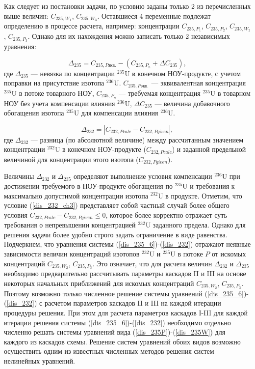 Как следует из постановки задачи, по условию заданы только 2 из перечисленных выше величин: $C_{235,{W_1}}$, $C_{235,{W_3}}$. Оставшиеся 4 переменные подлежат определению в процессе расчета, например: концентрации $C_{235,{P_1}}$, $C_{235,{P_2}}$, $C_{235,{W_2}}$, $C_{235,{P_3}}$. Однако для их нахождения можно записать только 2 независимых уравнения:  

\begin{equation}
    \label{dis_235_6}
    \Delta_{235}=C_{235,P\textit{экв.}}-(C_{235,{P_{n}}}+\Delta C_{235}),
\end{equation}
где $\Delta_{235}$ --- невязка по концентрации $^{235}$U в конечном НОУ-продукте, с учетом поправки на присутствие изотопа $^{236}$U. $C_{235,P\textit{экв.}}$ --- эквивалентная концентрация $^{235}$U в потоке товарного НОУ, $C_{235,{P_{n}}}$ --- требуемая концентрация $^{235}$U в товарном НОУ без учета компенсации влияния $^{236}$U, $\Delta C_{235}$ --- величина добавочного обогащения изотопа $^{235}$U для компенсации влияния $^{236}$U. 

\begin{equation}
\label{dis_232}
\Delta_{232}=\left|C_{232,P\textit{calc}}-C_{232,P\textit{given}}\right|,
\end{equation}
где $\Delta_{232}$ --- разница (по абсолютной величине) между рассчитанным значением концентрации $^{232}$U в конечном НОУ-продукте ($C_{232,P\textit{calc}}$) и заданной предельной величиной для концентрации этого изотопа ($C_{232,P\textit{given}}$).

Величины $\Delta_{232}$ и $\Delta_{235}$ определяют выполнение условия компенсации $^{236}$U при достижении требуемого в НОУ-продукте обогащения по $^{235}$U и требования к максимально допустимой концентрации изотопа $^{232}$U в продукте. Отметим, что условие (\ref{dis_232_ch3}) представляет собой частный случай более общего условия $C_{232,P\textit{calc}}-C_{232,P\textit{given}}\leq 0$, которое более корректно отражает суть требования о непревышении концентрацией $^{232}$U заданного предела. Однако для решения задачи более удобно строго задать ограничение в виде равенства. Подчеркнем, что уравнения системы (\ref{dis_235_6})-(\ref{dis_232}) отражают неявные зависимости величин концентраций изотопов $^{232}$U и $^{235}$U в потоке $P$ от искомых концентраций $C_{235,{W_2}}$, $C_{235,{P_3}}$. Это означает, что для расчета величин $\Delta_{232}$ и $\Delta_{235}$ необходимо предварительно рассчитывать параметры каскадов II и III на основе некоторых начальных приближений для искомых концентраций $C_{235,{W_2}}$, $C_{235,{P_3}}$. Поэтому возможно только численное решение системы уравнений (\ref{dis_235_6})-(\ref{dis_232}) с расчетом параметров каскадов II и III на каждой итерации процедуры решения. При этом для расчета параметров каскадов I-III для каждой итерации решения системы (\ref{dis_235_6})-(\ref{dis_232}) необходимо отдельно численно решать системы уравнений вида (\ref{dis_235P})-(\ref{dis_235W}) для каждого из каскадов схемы. Решение систем уравнений обоих видов возможно осуществить одним из известных численных методов решения систем нелинейных уравнений. 

